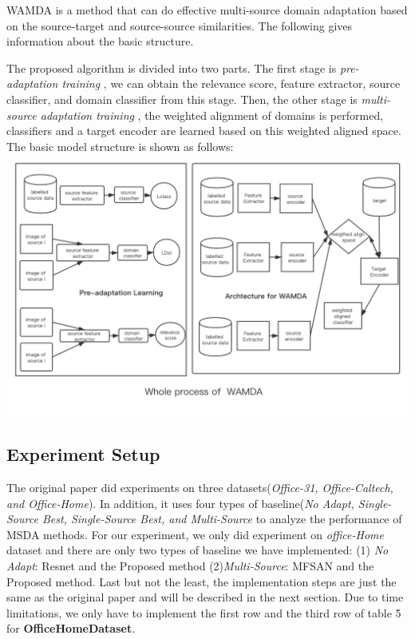 \documentclass[11pt]{article}
\makeatletter
\def\maxwidth{\ifdim\Gin@nat@width>\linewidth\linewidth
    \else\Gin@nat@width\fi}
\let\Oldincludegraphics\includegraphics
\renewcommand{\includegraphics}[1]{\Oldincludegraphics[width=.8\maxwidth]{#1}}
\makeatother
\begin{document}
WAMDA is a method that can do effective multi-source domain adaptation
based on the source-target and source-source similarities. The following
gives information about the basic structure.

The proposed algorithm is divided into two parts. The first stage is
\emph{pre-adaptation training} , we can obtain the relevance score,
feature extractor, source classifier, and domain classifier from this
stage. Then, the other stage is \emph{multi-source adaptation training}
, the weighted alignment of domains is performed, classifiers and a
target encoder are learned based on this weighted aligned space. The
basic model structure is shown as follows:
\includegraphics{imgs/process.png}

    \hypertarget{experiment-setup}{%
\subsection{Experiment Setup}\label{experiment-setup}}

The original paper did experiments on three datasets(\emph{Office-31,
Office-Caltech, and Office-Home}). In addition, it uses four types of
baseline(\emph{No Adapt, Single-Source Best, Single-Source Best, and
Multi-Source} to analyze the performance of MSDA methods. For our
experiment, we only did experiment on \emph{office-Home} dataset and
there are only two types of baseline we have implemented: (1) \emph{No
Adapt}: Resnet and the Proposed method (2)\emph{Multi-Source}: MFSAN and
the Proposed method. Last but not the least, the implementation steps
are just the same as the original paper and will be described in the
next section. Due to time limitations, we only have to implement the
first row and the third row of table 5 for \textbf{OfficeHomeDataset}.
\end{document}
